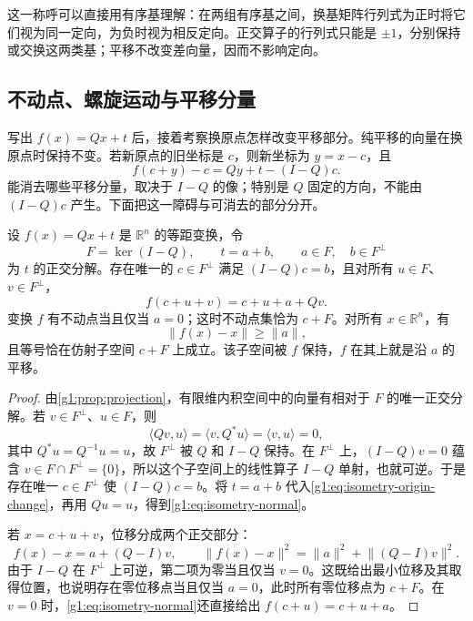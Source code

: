 这一称呼可以直接用有序基理解：在两组有序基之间，换基矩阵行列式为正时将它们视为同一定向，为负时视为相反定向。正交算子的行列式只能是 \(\pm1\)，分别保持或交换这两类基；平移不改变差向量，因而不影响定向。

\subsection{不动点、螺旋运动与平移分量}
\label{g1:subsec:0103:03}

写出 \(f(x)=Qx+t\) 后，接着考察换原点怎样改变平移部分。纯平移的向量在换原点时保持不变。若新原点的旧坐标是 \(c\)，则新坐标为 \(y=x-c\)，且
\begin{equation}
	\label{g1:eq:isometry-origin-change}
	f(c+y)-c=Qy+t-(I-Q)c.
\end{equation}
能消去哪些平移分量，取决于 \(I-Q\) 的像；特别是 \(Q\) 固定的方向，不能由 \((I-Q)c\) 产生。下面把这一障碍与可消去的部分分开。

\begin{theorem}
	\label{g1:thm:isometry-normal}
	设 \(f(x)=Qx+t\) 是 \(\mathbb R^n\) 的等距变换，令
	\[
		F=\ker(I-Q),\qquad t=a+b,\qquad a\in F,\quad b\in F^\perp
	\]
	为 \(t\) 的正交分解。存在唯一的 \(c\in F^\perp\) 满足 \((I-Q)c=b\)，且对所有 \(u\in F\)、\(v\in F^\perp\)，
	\begin{equation}
		\label{g1:eq:isometry-normal}
		f(c+u+v)=c+u+a+Qv.
	\end{equation}
	变换 \(f\) 有不动点当且仅当 \(a=0\)；这时不动点集恰为 \(c+F\)。对所有 \(x\in\mathbb R^n\)，有
	\[
		\lVert f(x)-x\rVert\geq\lVert a\rVert,
	\]
	且等号恰在仿射子空间 \(c+F\) 上成立。该子空间被 \(f\) 保持，\(f\) 在其上就是沿 \(a\) 的平移。
\end{theorem}

\begin{proof}
	由\cref{g1:prop:projection}，有限维内积空间中的向量有相对于 \(F\) 的唯一正交分解。若 \(v\in F^\perp\)、\(u\in F\)，则
	\[
		\langle Qv,u\rangle=\langle v,Q^*u\rangle
		=\langle v,u\rangle=0,
	\]
	其中 \(Q^*u=Q^{-1}u=u\)，故 \(F^\perp\) 被 \(Q\) 和 \(I-Q\) 保持。在 \(F^\perp\) 上，\((I-Q)v=0\) 蕴含 \(v\in F\cap F^\perp=\{0\}\)，所以这个子空间上的线性算子 \(I-Q\) 单射，也就可逆。于是存在唯一 \(c\in F^\perp\) 使 \((I-Q)c=b\)。将 \(t=a+b\) 代入\eqref{g1:eq:isometry-origin-change}，再用 \(Qu=u\)，得到\eqref{g1:eq:isometry-normal}。

	若 \(x=c+u+v\)，位移分成两个正交部分：
	\[
		f(x)-x=a+(Q-I)v,
		\qquad
		\lVert f(x)-x\rVert^2=\lVert a\rVert^2+\lVert(Q-I)v\rVert^2.
	\]
	由于 \(I-Q\) 在 \(F^\perp\) 上可逆，第二项为零当且仅当 \(v=0\)。这既给出最小位移及其取得位置，也说明存在零位移点当且仅当 \(a=0\)，此时所有零位移点为 \(c+F\)。在 \(v=0\) 时，\eqref{g1:eq:isometry-normal}还直接给出 \(f(c+u)=c+u+a\)。
\end{proof}

